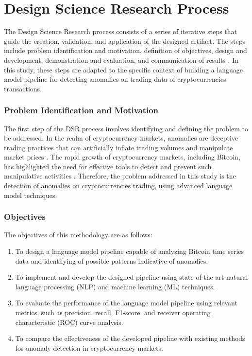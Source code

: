 \section{Design Science Research Process}
The Design Science Research process consists of a series of iterative steps that guide the creation, validation, and
application of the designed artifact. The steps include problem identification and motivation, definition of objectives,
design and development, demonstration and evaluation, and communication of results \cite{hevner2010design,
peffers2007design}. In this study, these steps are adapted to the specific context of building a language model pipeline
for detecting anomalies on trading data of cryptocurrencies transactions.

\subsubsection{Problem Identification and Motivation}
The first step of the DSR process involves identifying and defining the problem to be addressed. In the realm of
cryptocurrency markets, anomalies are deceptive trading practices that can artificially inflate trading volumes and
manipulate market prices \cite{gandal2018price, cartea2016algorithmic}. The rapid growth of cryptocurrency markets,
including Bitcoin, has highlighted the need for effective tools to detect and prevent such manipulative activities
\cite{chan2017statistical}. Therefore, the problem addressed in this study is the detection of anomalies on
cryptocurrencies trading, using advanced language model techniques.

\subsubsection{Objectives}
The objectives of this methodology are as follows:

\begin{enumerate}
    \item To design a language model pipeline capable of analyzing Bitcoin time series data and identifying of possible
    patterns indicative of anomalies.
    \item To implement and develop the designed pipeline using state-of-the-art natural language processing (NLP) and
    machine learning (ML) techniques.
    \item To evaluate the performance of the language model pipeline using relevant metrics, such as precision, recall,
    F1-score, and receiver operating characteristic (ROC) curve analysis.
    \item To compare the effectiveness of the developed pipeline with existing methods for anomaly detection in
    cryptocurrency markets.
\end{enumerate}

